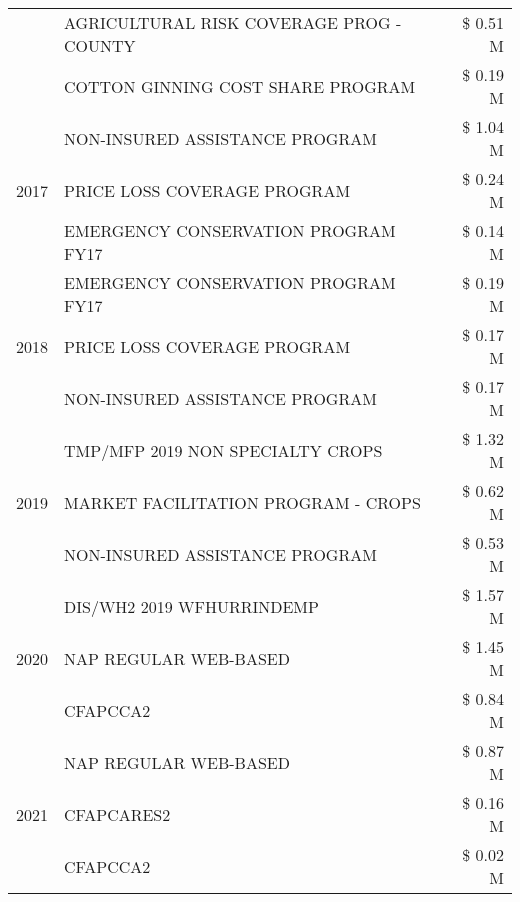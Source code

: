 \begin{tabular}{llr}
 & AGRICULTURAL RISK COVERAGE PROG - COUNTY & \$ 0.51 M \\
 & COTTON GINNING COST SHARE PROGRAM & \$ 0.19 M \\
\cline{1-3}
\multirow[t]{3}{*}{2017} & NON-INSURED ASSISTANCE PROGRAM & \$ 1.04 M \\
 & PRICE LOSS COVERAGE PROGRAM & \$ 0.24 M \\
 & EMERGENCY CONSERVATION PROGRAM FY17 & \$ 0.14 M \\
\cline{1-3}
\multirow[t]{3}{*}{2018} & EMERGENCY CONSERVATION PROGRAM FY17 & \$ 0.19 M \\
 & PRICE LOSS COVERAGE PROGRAM & \$ 0.17 M \\
 & NON-INSURED ASSISTANCE PROGRAM & \$ 0.17 M \\
\cline{1-3}
\multirow[t]{3}{*}{2019} & TMP/MFP 2019 NON SPECIALTY CROPS & \$ 1.32 M \\
 & MARKET FACILITATION PROGRAM - CROPS & \$ 0.62 M \\
 & NON-INSURED ASSISTANCE PROGRAM & \$ 0.53 M \\
\cline{1-3}
\multirow[t]{3}{*}{2020} & DIS/WH2 2019 WFHURRINDEMP & \$ 1.57 M \\
 & NAP REGULAR WEB-BASED & \$ 1.45 M \\
 & CFAPCCA2 & \$ 0.84 M \\
\cline{1-3}
\multirow[t]{3}{*}{2021} & NAP REGULAR WEB-BASED & \$ 0.87 M \\
 & CFAPCARES2 & \$ 0.16 M \\
 & CFAPCCA2 & \$ 0.02 M \\
\cline{1-3}
\bottomrule
\end{tabular}
